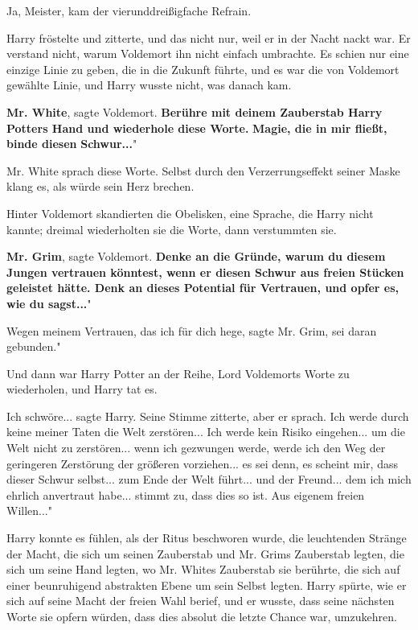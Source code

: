 \glqq Ja, Meister\grqq{}, kam der vierunddreißigfache Refrain.

Harry fröstelte und zitterte, und das nicht nur, weil er in der Nacht nackt war.
Er verstand nicht, warum Voldemort ihn nicht einfach umbrachte. Es schien nur
eine einzige Linie zu geben, die in die Zukunft führte, und es war die von
Voldemort gewählte Linie, und Harry wusste nicht, was danach kam.

\glqq \textbf{Mr. White}\grqq{}, sagte Voldemort. \glqq \textbf{Berühre mit
deinem Zauberstab Harry Potters Hand und wiederhole diese Worte.} \textbf{Magie,
die in mir fließt, binde diesen }\textbf{Schwur...}"

Mr. White sprach diese Worte. Selbst durch den Verzerrungseffekt seiner Maske
klang es, als würde sein Herz brechen.

Hinter Voldemort skandierten die Obelisken, eine Sprache, die Harry nicht
kannte; dreimal wiederholten sie die Worte, dann verstummten sie.

\glqq \textbf{Mr. Grim}\grqq{}, sagte Voldemort. \glqq \textbf{Denke an die
Gründe, warum du diesem Jungen vertrauen könntest, wenn er diesen Schwur aus
freien Stücken geleistet hätte. Denk an dieses Potential für Vertrauen, und
opfer es, wie du sagst...}"

\glqq Wegen meinem Vertrauen, das ich für dich hege\grqq{}, sagte Mr. Grim,
\glqq sei daran gebunden."

Und dann war Harry Potter an der Reihe, Lord Voldemorts Worte zu wiederholen,
und Harry tat es.

\glqq Ich schwöre...\grqq{} sagte Harry. Seine Stimme zitterte, aber er sprach.
\glqq Ich werde durch keine meiner Taten die Welt zerstören... Ich werde kein
Risiko eingehen... um die Welt nicht zu zerstören... wenn ich gezwungen werde,
werde ich den Weg der geringeren Zerstörung der größeren vorziehen... es sei
denn, es scheint mir, dass dieser Schwur selbst... zum Ende der Welt führt...
und der Freund... dem ich mich ehrlich anvertraut habe... stimmt zu, dass dies
so ist. Aus eigenem freien Willen..."

Harry konnte es fühlen, als der Ritus beschworen wurde, die leuchtenden Stränge
der Macht, die sich um seinen Zauberstab und Mr. Grims Zauberstab legten, die
sich um seine Hand legten, wo Mr. Whites Zauberstab sie berührte, die sich auf
einer beunruhigend abstrakten Ebene um sein Selbst legten. Harry spürte, wie er
sich auf seine Macht der freien Wahl berief, und er wusste, dass seine nächsten
Worte sie opfern würden, dass dies absolut die letzte Chance war, umzukehren.

